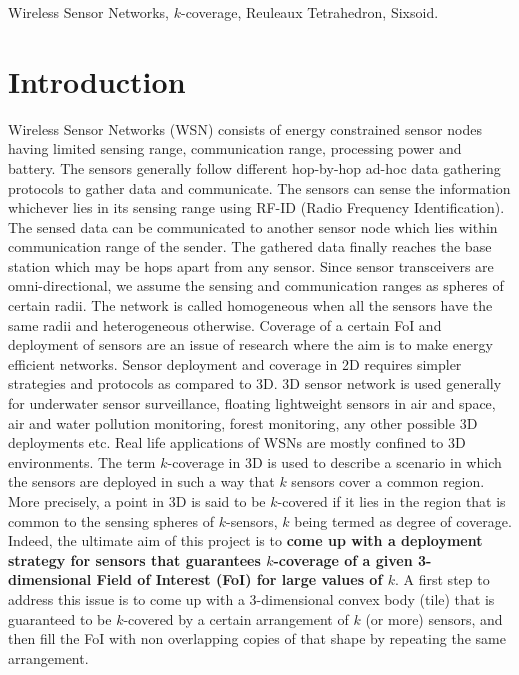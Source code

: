 \documentclass[conference]{IEEEtran}
\begin{document}
\begin{IEEEkeywords}
Wireless Sensor Networks, $k$-coverage, Reuleaux Tetrahedron, Sixsoid.
\end{IEEEkeywords}


\IEEEpeerreviewmaketitle


\section{Introduction}
Wireless Sensor Networks (WSN) consists of energy constrained sensor nodes having limited sensing range, communication range, processing power and battery. The sensors generally follow different hop-by-hop ad-hoc data gathering protocols to gather data and communicate. The sensors can sense the information whichever lies in its sensing range using RF-ID (Radio Frequency Identification). The sensed data can be communicated to another sensor node which lies within communication range of the sender. 
The gathered data finally reaches the base station which may be hops apart from any sensor. Since sensor transceivers are omni-directional, we assume the sensing and communication ranges as spheres of certain radii. The network is called homogeneous when all the sensors have the same radii and heterogeneous otherwise. Coverage of a certain FoI and deployment of sensors are an issue of research where the aim is to make energy efficient networks. Sensor deployment and coverage in 2D requires simpler strategies and protocols as compared to 3D. 3D sensor network is used generally for underwater sensor surveillance, floating lightweight sensors in air and space, air and water pollution monitoring, forest monitoring, any other possible 3D deployments etc. Real life applications of WSNs are mostly confined to 3D environments. The term $k$-coverage in 3D is used to describe a scenario in which the sensors are deployed in such a way that $k$ sensors cover a common region. More precisely, a point in 3D is said to be $k$-covered if it lies in the region that is common to the sensing spheres of $k$-sensors, $k$ being termed as degree of coverage. Indeed, the ultimate aim of this project is to \textbf{come up with a deployment strategy for sensors that guarantees $k$-coverage of a given 3-dimensional Field of Interest (FoI) for large values of $k$}. A first step to address this issue is to come up with a 3-dimensional convex body (tile) that is guaranteed to be $k$-covered by a certain arrangement of $k$ (or more) sensors, and then fill the FoI with non overlapping copies of that shape by repeating the same arrangement.
\end{document}

